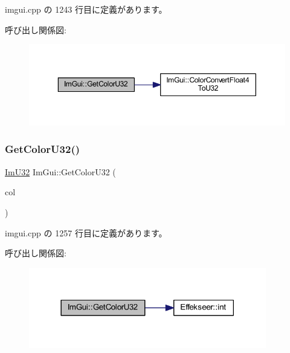  imgui.\+cpp の 1243 行目に定義があります。

呼び出し関係図\+:\nopagebreak
\begin{figure}[H]
\begin{center}
\leavevmode
\includegraphics[width=350pt]{namespace_im_gui_ac701752365ddd58cecc1956fc62921a8_cgraph}
\end{center}
\end{figure}
\mbox{\label{namespace_im_gui_a834649713437e8fdfa0e5a4fb780d35b}} 
\subsubsection{\texorpdfstring{Get\+Color\+U32()}{GetColorU32()}\hspace{0.1cm}{\footnotesize\ttfamily [3/3]}}
{\footnotesize\ttfamily \mbox{\hyperlink{imgui_8h_a118cff4eeb8d00e7d07ce3d6460eed36}{Im\+U32}} Im\+Gui\+::\+Get\+Color\+U32 (\begin{DoxyParamCaption}\item[{\mbox{\hyperlink{imgui_8h_a118cff4eeb8d00e7d07ce3d6460eed36}{Im\+U32}}}]{col }\end{DoxyParamCaption})}



 imgui.\+cpp の 1257 行目に定義があります。

呼び出し関係図\+:\nopagebreak
\begin{figure}[H]
\begin{center}
\leavevmode
\includegraphics[width=294pt]{namespace_im_gui_a834649713437e8fdfa0e5a4fb780d35b_cgraph}
\end{center}
\end{figure}
\mbox{\label{namespace_im_gui_acc31f8eea4fcfb86edeb3ac12d82fc05}} 
